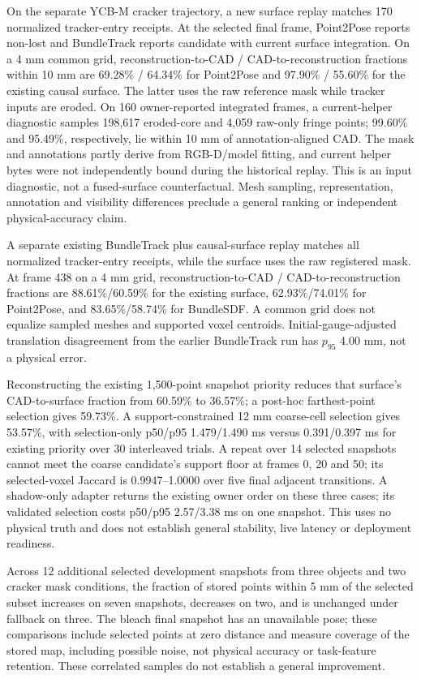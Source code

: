 \documentclass[10pt,journal]{IEEEtran}
\begin{document}
On the separate YCB-M cracker trajectory, a new surface replay matches 170 normalized tracker-entry receipts. At the selected final frame, Point2Pose reports non-lost and BundleTrack reports candidate with current surface integration. On a 4 mm common grid, reconstruction-to-CAD / CAD-to-reconstruction fractions within 10 mm are 69.28\% / 64.34\% for Point2Pose and 97.90\% / 55.60\% for the existing causal surface. The latter uses the raw reference mask while tracker inputs are eroded. On 160 owner-reported integrated frames, a current-helper diagnostic samples 198,617 eroded-core and 4,059 raw-only fringe points; 99.60\% and 95.49\%, respectively, lie within 10 mm of annotation-aligned CAD. The mask and annotations partly derive from RGB-D/model fitting, and current helper bytes were not independently bound during the historical replay. This is an input diagnostic, not a fused-surface counterfactual. Mesh sampling, representation, annotation and visibility differences preclude a general ranking or independent physical-accuracy claim.

A separate existing BundleTrack plus causal-surface replay matches all normalized tracker-entry receipts, while the surface uses the raw registered mask. At frame 438 on a 4 mm grid, reconstruction-to-CAD / CAD-to-reconstruction fractions are 88.61\%/60.59\% for the existing surface, 62.93\%/74.01\% for Point2Pose, and 83.65\%/58.74\% for BundleSDF. A common grid does not equalize sampled meshes and supported voxel centroids. Initial-gauge-adjusted translation disagreement from the earlier BundleTrack run has $p_{95}$ 4.00 mm, not a physical error.

Reconstructing the existing 1,500-point snapshot priority reduces that surface's CAD-to-surface fraction from 60.59\% to 36.57\%; a post-hoc farthest-point selection gives 59.73\%. A support-constrained 12 mm coarse-cell selection gives 53.57\%, with selection-only p50/p95 1.479/1.490 ms versus 0.391/0.397 ms for existing priority over 30 interleaved trials. A repeat over 14 selected snapshots cannot meet the coarse candidate's support floor at frames 0, 20 and 50; its selected-voxel Jaccard is 0.9947--1.0000 over five final adjacent transitions. A shadow-only adapter returns the existing owner order on these three cases; its validated selection costs p50/p95 2.57/3.38 ms on one snapshot. This uses no physical truth and does not establish general stability, live latency or deployment readiness.

Across 12 additional selected development snapshots from three objects and two cracker mask conditions, the fraction of stored points within 5 mm of the selected subset increases on seven snapshots, decreases on two, and is unchanged under fallback on three. The bleach final snapshot has an unavailable pose; these comparisons include selected points at zero distance and measure coverage of the stored map, including possible noise, not physical accuracy or task-feature retention. These correlated samples do not establish a general improvement.
\end{document}
